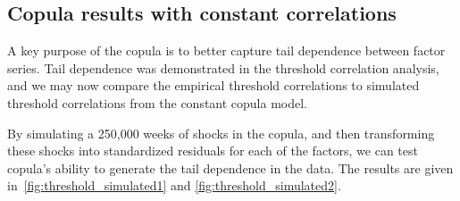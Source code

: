 
\subsection{Copula results with constant correlations}
A key purpose of the copula is to better capture tail dependence between factor series. Tail dependence was demonstrated in the threshold correlation analysis, and we may now compare the empirical threshold correlations to simulated threshold correlations from the constant copula model. 

By simulating a 250,000 weeks of shocks in the copula, and then transforming these shocks into standardized residuals for each of the factors, we can test copula's ability to generate the tail dependence in the data. The results are given in~\autoref{fig:threshold_simulated1} and \autoref{fig:threshold_simulated2}.

